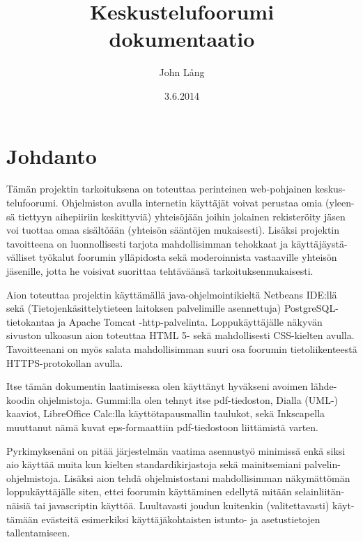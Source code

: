\documentclass[11pt]{article}
\title{\textbf{Keskustelufoorumi}\\ \small{dokumentaatio}}
\author{John Lång}
\date{3.6.2014}
\begin{document}
\maketitle

\thispagestyle{empty}

\newpage
\tableofcontents
\thispagestyle{empty}

\newpage

\section{Johdanto}
	Tämän projektin tarkoituksena on toteuttaa perinteinen web-pohjainen keskus-telufoorumi. Ohjelmiston
	avulla internetin käyttäjät voivat perustaa omia (yleen-sä tiettyyn aihepiiriin keskittyviä) yhteisöjään
	joihin jokainen rekisteröity jäsen voi tuottaa omaa sisältöään (yhteisön sääntöjen mukaisesti). Lisäksi
	projektin tavoitteena on luonnollisesti tarjota mahdollisimman tehokkaat ja käyttäjäystä-välliset työkalut 
	foorumin ylläpidosta sekä moderoinnista vastaaville yhteisön jäsenille, jotta he voisivat suorittaa
	tehtäväänsä	tarkoituksenmukaisesti.
		
	Aion toteuttaa projektin käyttämällä java-ohjelmointikieltä Netbeans IDE:llä sekä (Tietojenkäsittelytieteen laitoksen
	palvelimille asennettuja) PostgreSQL-tietokantaa ja Apache Tomcat -http-palvelinta. Loppukäyttäjälle
	näkyvän sivuston ulkoasun aion toteuttaa HTML 5- sekä mahdollisesti CSS-kielten avulla. Tavoitteenani
	on myös salata mahdollisimman suuri osa foorumin tietoliikenteestä HTTPS-protokollan avulla.
	
	Itse tämän dokumentin laatimisessa olen käyttänyt hyväkseni avoimen lähde-koodin ohjelmistoja.
	Gummi:lla olen tehnyt itse pdf-tiedoston, Dialla (UML-)\\ kaaviot, LibreOffice Calc:lla käyttötapausmallin
	taulukot, sekä Inkscapella muuttanut nämä kuvat eps-formaattiin pdf-tiedostoon liittämistä varten.
	
	Pyrkimyksenäni on pitää järjestelmän vaatima asennustyö minimissä enkä siksi aio käyttää muita kun kielten
	standardikirjastoja sekä mainitsemiani palvelin-ohjelmistoja. Lisäksi aion tehdä ohjelmistostani mahdollisimman näkymättömän loppukäyttäjälle
	siten, ettei foorumin käyttäminen edellytä mitään selainliitän-näisiä tai javascriptin käyttöä. Luultavasti
	joudun kuitenkin (valitettavasti) käyt-tämään evästeitä esimerkiksi käyttäjäkohtaisten istunto- ja
	asetustietojen tallentamiseen.
	
\end{document}
